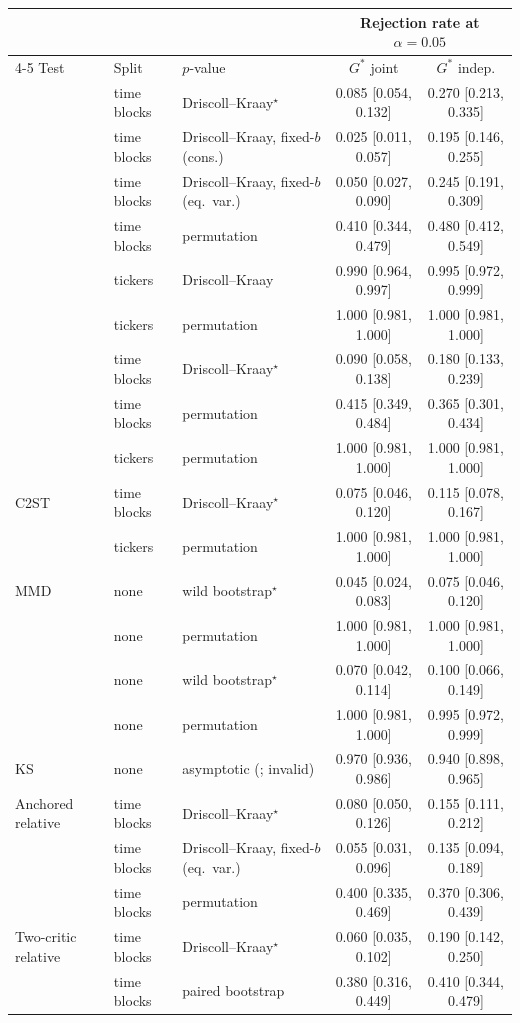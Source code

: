 \begin{tabular}{lllcc}
\toprule
 & & & \multicolumn{2}{c}{Rejection rate at $\alpha=0.05$} \\
\cmidrule(lr){4-5}
Test & Split & $p$-value & $G^*$ joint & $G^*$ indep. \\
\midrule
\WC{} & time blocks & Driscoll--Kraay$^{\star}$ & 0.085 [0.054, 0.132] & 0.270 [0.213, 0.335] \\
 & time blocks & Driscoll--Kraay, fixed-$b$ (cons.) & 0.025 [0.011, 0.057] & 0.195 [0.146, 0.255] \\
 & time blocks & Driscoll--Kraay, fixed-$b$ (eq.\ var.) & 0.050 [0.027, 0.090] & 0.245 [0.191, 0.309] \\
 & time blocks & permutation & 0.410 [0.344, 0.479] & 0.480 [0.412, 0.549] \\
 & tickers & Driscoll--Kraay & 0.990 [0.964, 0.997] & 0.995 [0.972, 0.999] \\
 & tickers & permutation & 1.000 [0.981, 1.000] & 1.000 [0.981, 1.000] \\
\addlinespace[2pt]
\LRC{} & time blocks & Driscoll--Kraay$^{\star}$ & 0.090 [0.058, 0.138] & 0.180 [0.133, 0.239] \\
 & time blocks & permutation & 0.415 [0.349, 0.484] & 0.365 [0.301, 0.434] \\
 & tickers & permutation & 1.000 [0.981, 1.000] & 1.000 [0.981, 1.000] \\
\addlinespace[2pt]
C2ST & time blocks & Driscoll--Kraay$^{\star}$ & 0.075 [0.046, 0.120] & 0.115 [0.078, 0.167] \\
 & tickers & permutation & 1.000 [0.981, 1.000] & 1.000 [0.981, 1.000] \\
\addlinespace[2pt]
MMD & none & wild bootstrap$^{\star}$ & 0.045 [0.024, 0.083] & 0.075 [0.046, 0.120] \\
 & none & permutation & 1.000 [0.981, 1.000] & 1.000 [0.981, 1.000] \\
\addlinespace[2pt]
\SigMMD{} & none & wild bootstrap$^{\star}$ & 0.070 [0.042, 0.114] & 0.100 [0.066, 0.149] \\
 & none & permutation & 1.000 [0.981, 1.000] & 0.995 [0.972, 0.999] \\
\addlinespace[2pt]
KS & none & asymptotic (\iid{}; invalid) & 0.970 [0.936, 0.986] & 0.940 [0.898, 0.965] \\
\addlinespace[2pt]
Anchored relative & time blocks & Driscoll--Kraay$^{\star}$ & 0.080 [0.050, 0.126] & 0.155 [0.111, 0.212] \\
 & time blocks & Driscoll--Kraay, fixed-$b$ (eq.\ var.) & 0.055 [0.031, 0.096] & 0.135 [0.094, 0.189] \\
 & time blocks & permutation & 0.400 [0.335, 0.469] & 0.370 [0.306, 0.439] \\
\addlinespace[2pt]
Two-critic relative & time blocks & Driscoll--Kraay$^{\star}$ & 0.060 [0.035, 0.102] & 0.190 [0.142, 0.250] \\
 & time blocks & paired bootstrap & 0.380 [0.316, 0.449] & 0.410 [0.344, 0.479] \\
\bottomrule
\end{tabular}

